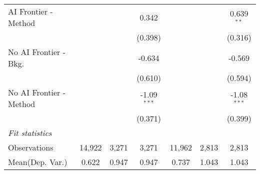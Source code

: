 \begin{tabular}{lcccccc}
   AI Frontier - Method    &                &              & 0.342         &                &             & 0.639$^{**}$\\   
                           &                &              & (0.398)       &                &             & (0.316)\\   
   No AI Frontier - Bkg.   &                &              & -0.634        &                &             & -0.569\\   
                           &                &              & (0.610)       &                &             & (0.594)\\   
   No AI Frontier - Method &                &              & -1.09$^{***}$ &                &             & -1.08$^{***}$\\   
                           &                &              & (0.371)       &                &             & (0.399)\\   
   \midrule
   \emph{Fit statistics}\\
   Observations            & 14,922         & 3,271        & 3,271         & 11,962         & 2,813       & 2,813\\  
Mean(Dep. Var.) & 0.622 & 0.947 & 0.947 & 0.737 & 1.043 & 1.043 \\
   

\end{tabular}
